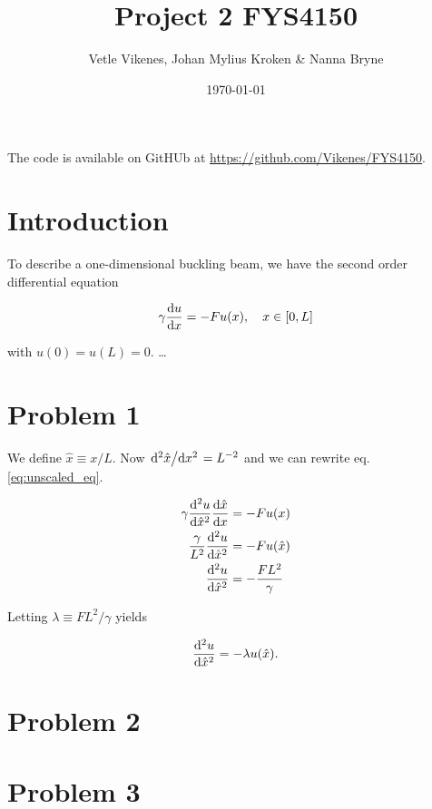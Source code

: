 \documentclass[english,notitlepage]{revtex4-1}  %
\begin{document}
\title{Project 2 FYS4150}      %
\author{Vetle Vikenes, Johan Mylius Kroken \& Nanna Bryne}          %
\date{\today}                             %
\noaffiliation                            %


\maketitle 
    
The code is available on GitHUb at \url{https://github.com/Vikenes/FYS4150}.
    

\section*{Introduction}

To describe a one-dimensional buckling beam, we have the second order differential equation 

\begin{align}\label{eq:unscaled_eq}
    \gamma \dv{u}{x} = -F u(x), \quad x\in [0,L]
\end{align}

with $u(0)=u(L)=0$. \dots

\section*{Problem 1}

We define $\hat{x}\equiv x/L$. Now $\dv*[2]{\hat{x}}{x}=L^{-2}$ and we can rewrite eq. \eqref{eq:unscaled_eq}.

\begin{align*}
    \gamma \dv[2]{u}{\hat{x}} \dv{\hat{x}}{x} & = -Fu(x) \\
    \frac{\gamma}{L^2} \dv[2]{u}{\hat{x}} &= -Fu(\hat{x}) \\
    \dv[2]{u}{\hat{x}} &= - \frac{FL^2}{\gamma}
\end{align*}

Letting $\lambda \equiv FL^2/\gamma$ yields

\begin{align}\label{p1_scaled_eq}
    \dv[2]{u}{\hat{x}} = -\lambda u(\hat{x}).
\end{align}

\section*{Problem 2}


\section*{Problem 3}
\end{document}
